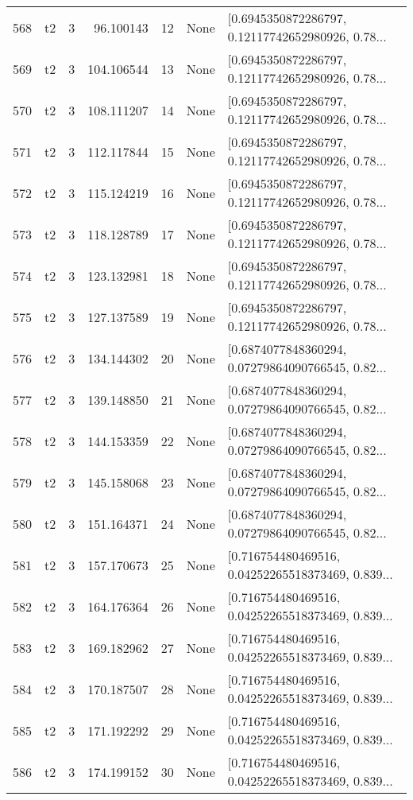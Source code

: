 \begin{tabular}{lllrlll}
568 &  t2 &   3 &    96.100143 &   12 &  None &  [0.6945350872286797, 0.12117742652980926, 0.78... \\
569 &  t2 &   3 &   104.106544 &   13 &  None &  [0.6945350872286797, 0.12117742652980926, 0.78... \\
570 &  t2 &   3 &   108.111207 &   14 &  None &  [0.6945350872286797, 0.12117742652980926, 0.78... \\
571 &  t2 &   3 &   112.117844 &   15 &  None &  [0.6945350872286797, 0.12117742652980926, 0.78... \\
572 &  t2 &   3 &   115.124219 &   16 &  None &  [0.6945350872286797, 0.12117742652980926, 0.78... \\
573 &  t2 &   3 &   118.128789 &   17 &  None &  [0.6945350872286797, 0.12117742652980926, 0.78... \\
574 &  t2 &   3 &   123.132981 &   18 &  None &  [0.6945350872286797, 0.12117742652980926, 0.78... \\
575 &  t2 &   3 &   127.137589 &   19 &  None &  [0.6945350872286797, 0.12117742652980926, 0.78... \\
576 &  t2 &   3 &   134.144302 &   20 &  None &  [0.6874077848360294, 0.07279864090766545, 0.82... \\
577 &  t2 &   3 &   139.148850 &   21 &  None &  [0.6874077848360294, 0.07279864090766545, 0.82... \\
578 &  t2 &   3 &   144.153359 &   22 &  None &  [0.6874077848360294, 0.07279864090766545, 0.82... \\
579 &  t2 &   3 &   145.158068 &   23 &  None &  [0.6874077848360294, 0.07279864090766545, 0.82... \\
580 &  t2 &   3 &   151.164371 &   24 &  None &  [0.6874077848360294, 0.07279864090766545, 0.82... \\
581 &  t2 &   3 &   157.170673 &   25 &  None &  [0.716754480469516, 0.04252265518373469, 0.839... \\
582 &  t2 &   3 &   164.176364 &   26 &  None &  [0.716754480469516, 0.04252265518373469, 0.839... \\
583 &  t2 &   3 &   169.182962 &   27 &  None &  [0.716754480469516, 0.04252265518373469, 0.839... \\
584 &  t2 &   3 &   170.187507 &   28 &  None &  [0.716754480469516, 0.04252265518373469, 0.839... \\
585 &  t2 &   3 &   171.192292 &   29 &  None &  [0.716754480469516, 0.04252265518373469, 0.839... \\
586 &  t2 &   3 &   174.199152 &   30 &  None &  [0.716754480469516, 0.04252265518373469, 0.839... \\

\end{tabular}
